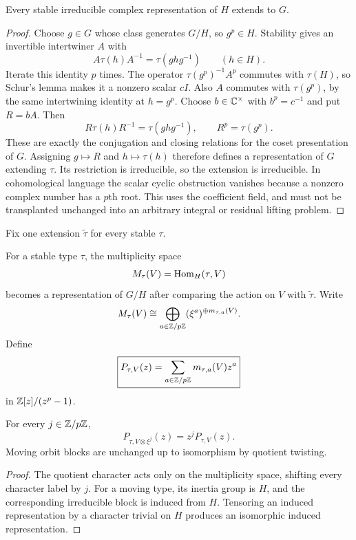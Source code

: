 \begin{lemma}\label{lem:stable_extension}
Every stable irreducible complex representation of \(H\) extends to \(G\).
\end{lemma}

\begin{proof}
Choose \(g\in G\) whose class generates \(G/H\), so \(g^p\in H\). Stability gives an invertible intertwiner \(A\) with
\[
 A\tau(h)A^{-1}=\tau(ghg^{-1})\qquad(h\in H).
\]
Iterate this identity \(p\) times. The operator \(\tau(g^p)^{-1}A^p\) commutes with \(\tau(H)\), so Schur's lemma makes it a nonzero scalar \(cI\). Also \(A\) commutes with \(\tau(g^p)\), by the same intertwining identity at \(h=g^p\). Choose \(b\in\mathbb C^\times\) with \(b^p=c^{-1}\) and put \(R=bA\). Then
\[
 R\tau(h)R^{-1}=\tau(ghg^{-1}),\qquad R^p=\tau(g^p).
\]
These are exactly the conjugation and closing relations for the coset presentation of \(G\). Assigning \(g\mapsto R\) and \(h\mapsto\tau(h)\) therefore defines a representation of \(G\) extending \(\tau\). Its restriction is irreducible, so the extension is irreducible. In cohomological language the scalar cyclic obstruction vanishes because a nonzero complex number has a \(p\)th root. This uses the coefficient field, and must not be transplanted unchanged into an arbitrary integral or residual lifting problem.
\end{proof}

Fix one extension \(\widetilde\tau\) for every stable \(\tau\).

\begin{definition}\label{def:extension_spectrum}
For a stable type \(\tau\), the multiplicity space
\[
 M_\tau(V)=\operatorname{Hom}_H(\tau,V)
\]
becomes a representation of \(G/H\) after comparing the action on \(V\) with \(\widetilde\tau\). Write
\[
 M_\tau(V)
 \cong
 \bigoplus_{a\in\mathbb Z/p\mathbb Z}
 (\xi^a)^{\oplus m_{\tau,a}(V)}.
\]
Define
\[
 \boxed{
 P_{\tau,V}(z)
 =
 \sum_{a\in\mathbb Z/p\mathbb Z}
 m_{\tau,a}(V)z^a
 }
\]
in \(\mathbb Z[z]/(z^p-1)\).
\end{definition}

\begin{proposition}\label{prop:spectrum_twist}
For every \(j\in\mathbb Z/p\mathbb Z\),
\[
 \boxed{
 P_{\tau,V\otimes\xi^j}(z)
 =
 z^jP_{\tau,V}(z).
 }
\]
Moving orbit blocks are unchanged up to isomorphism by quotient twisting.
\end{proposition}

\begin{proof}
The quotient character acts only on the multiplicity space, shifting every character label by \(j\). For a moving type, its inertia group is \(H\), and the corresponding irreducible block is induced from \(H\). Tensoring an induced representation by a character trivial on \(H\) produces an isomorphic induced representation.
\end{proof}

